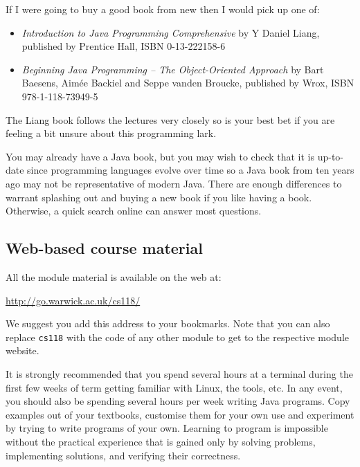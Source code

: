 If I were going to buy a good book from new then I would pick up one
of:
\begin{itemize}

\item
{\em Introduction to Java Programming Comprehensive} 
by Y Daniel Liang, published by Prentice Hall, ISBN 0-13-222158-6 

\item 
{\em Beginning Java Programming -- The Object-Oriented Approach} by 
Bart Baesens, Aim\'{e}e Backiel and Seppe vanden Broucke, published by 
Wrox, ISBN 978-1-118-73949-5 

\end{itemize}

The Liang book follows the lectures very closely so is your best bet if you are feeling a bit unsure about this programming lark. 
 
You may already have a Java book, but you may wish to check that it is up-to-date since programming languages evolve over time so a Java book from ten years ago may not be representative of modern Java. There are enough differences to warrant splashing out and buying a new book if you like having a book. Otherwise, a quick search online can answer most questions.

\subsection{Web-based course material}

All the module material is available on the web at:

\begin{center}
	\url{http://go.warwick.ac.uk/cs118/}
\end{center}

We suggest you add this address to your bookmarks. Note that you can also replace \texttt{cs118} with the code of any other module to get to the respective module website.

It is strongly recommended that you spend several hours at a terminal during the first few weeks of term getting familiar with
Linux, the tools, etc. In any event, you should also be spending
several hours per week writing Java programs. Copy examples out
of your textbooks, customise them for your own use and experiment
by trying to write programs of your own. Learning to program is impossible without the practical experience that is gained only by  solving problems, implementing solutions, and verifying their correctness.


